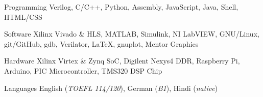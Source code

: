 
\begin{cvskills}

\cvskill
	{Programming} %
	{Verilog, C/C++, Python, Assembly, JavaScript, Java, Shell, HTML/CSS} %

\cvskill
	{Software} %
	{Xilinx Vivado \& HLS, MATLAB, Simulink, NI LabVIEW, GNU/Linux, git/GitHub, gdb, Verilator, \LaTeX, gnuplot, Mentor Graphics} %

\cvskill
	{Hardware} %
	{Xilinx Virtex \& Zynq SoC, Digilent Nexys4 DDR, Raspberry Pi, Arduino, PIC Microcontroller, TMS320 DSP Chip} %

\cvskill
	{Languages} %
	{English (\textit{TOEFL 114/120}), German (\textit{B1}), Hindi (\textit{native})} %

\end{cvskills}
